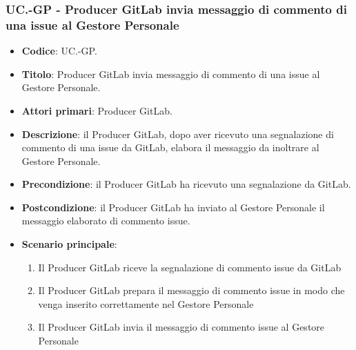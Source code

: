 
		\subsubsection{UC\theuccount.\thesubuccount-GP - Producer GitLab invia messaggio di commento di una issue al Gestore Personale}
		\begin{itemize}
			\item \textbf{Codice}: UC\theuccount.\thesubuccount-GP.
			\item \textbf{Titolo}: Producer GitLab invia messaggio di commento di una issue al Gestore Personale.
			\item \textbf{Attori primari}: Producer GitLab.
			\item \textbf{Descrizione}: il Producer GitLab, dopo aver ricevuto una segnalazione di commento di una issue da GitLab, elabora il messaggio da inoltrare al Gestore Personale.
			\item \textbf{Precondizione}: il Producer GitLab ha ricevuto una segnalazione da GitLab.
			\item \textbf{Postcondizione}: il Producer GitLab ha inviato al Gestore Personale il messaggio
			elaborato di commento issue.
			\item \textbf{Scenario principale}:
			\begin{enumerate}
				\item Il Producer GitLab riceve la segnalazione di commento issue da GitLab
				\item Il Producer GitLab prepara il messaggio di commento issue in modo che venga inserito correttamente nel Gestore Personale
				\item Il Producer GitLab invia il messaggio di commento issue al Gestore Personale
			\end{enumerate}
		\end{itemize}


